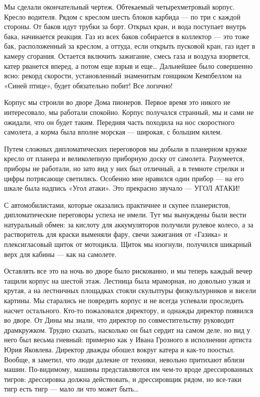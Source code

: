 Мы сделали окончательный чертеж. Обтекаемый четырехметровый корпус. Кресло
водителя. Рядом с креслом шесть блоков карбида — по три с каждой  стороны.
От баков идут трубки за борт.  Открыл кран, и вода поступает внутрь  бака,
начинается реакция. Газ из  всех баков собирается в  коллектор — это  тоже
бак, расположенный за креслом, а  оттуда, если открыть пусковой кран,  газ
идет в камеру сгорания. Остается включить зажигание, смесь газа и  воздуха
взорвется, катер рванется вперед, а потом еще взрыв и еще… Дальнейшее было
совершенно  ясно:  рекорд  скорости,  установленный  знаменитым   гонщиком
Кемпбеллом на «Синей птице», будет обязательно побит! Все логично!

Корпус мы  строили во  дворе Дома  пионеров. Первое  время это  никого  не
интересовало, мы работали спокойно. Корпус получался странный, мы и сами не
ожидали, что он будет  таким. Передняя часть  походила на нос  скоростного
самолета, а корма была вполне морская — широкая, с большим килем.

Путем сложных  дипломатических переговоров  мы добыли  в планерном  кружке
кресло от планера и великолепную приборную доску от самолета.  Разумеется,
приборы не работали, но зато вид у них был отличный, а в темноте стрелки и
цифры потрясающе  светились. Особенно  мне нравился  один прибор  — на  его
шкале была надпись «Угол атаки». Это прекрасно звучало — УГОЛ АТАКИ!

С автомобилистами,  которые  оказались практичнее  и  скупее  планеристов,
дипломатические переговоры успеха  не имели. Тут  мы вынуждены были  вести
натуральный обмен: за кислоту для аккумуляторов получили рулевое колесо, а
за растворитель для  краски выменяли  фару, свечи зажигания  от «Газика»  и
плексигласовый щиток от мотоцикла.  Щиток мы изогнули, получился  шикарный
верх для кабины — как на самолете.

Оставлять все это  на ночь во  дворе было рискованно,  и мы теперь  каждый
вечер тащили корпус на шестой  этаж. Лестница была мраморная, но  довольно
узкая  и   крутая,   а   на   лестничных   площадках   стояли   скульптуры
физкультурников и висели картины.  Мы старались не  повредить корпус и  не
всегда  успевали   проследить   насчет  остального.   Кто-то   пожаловался
директору, и однажды  директор появился во  дворе. От Дины  мы знали,  что
директор  по  совместительству  руководит  драмкружком.  Трудно   сказать,
насколько он был сердит на самом деле,  но вид у него был весьма  гневный:
примерно как у Ивана Грозного в исполнении артиста Юрия Яковлева. Директор
дважды обошел вокруг катера и как-то поостыл. Вообще, я заметил, что  люди
далекие от техники, невольно  притихают вблизи машин. По-видимому,  машины
представляются им чем-то  вроде дрессированных  тигров: дрессировка  должна
действовать, и дрессировщик рядом,  но все-таки тигр есть  тигр — мало  ли
что может быть…


